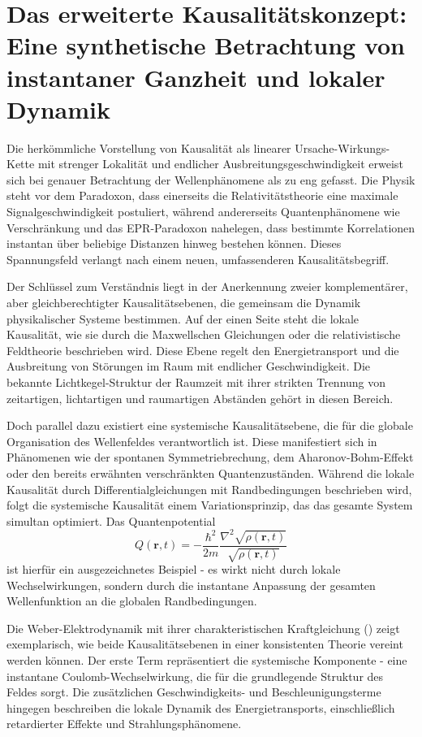 \section{Das erweiterte Kausalitätskonzept: Eine synthetische Betrachtung von instantaner Ganzheit und lokaler Dynamik}
Die herkömmliche Vorstellung von Kausalität als linearer Ursache-Wirkungs-Kette mit strenger Lokalität und endlicher Ausbreitungsgeschwindigkeit erweist sich bei genauer Betrachtung
der Wellenphänomene als zu eng gefasst. Die Physik steht vor dem Paradoxon, dass einerseits die Relativitätstheorie eine maximale Signalgeschwindigkeit postuliert, während andererseits
Quantenphänomene wie Verschränkung und das EPR-Paradoxon nahelegen, dass bestimmte Korrelationen instantan über beliebige Distanzen hinweg bestehen können. Dieses Spannungsfeld verlangt
nach einem neuen, umfassenderen Kausalitätsbegriff.

Der Schlüssel zum Verständnis liegt in der Anerkennung zweier komplementärer, aber gleichberechtigter Kausalitätsebenen, die gemeinsam die Dynamik physikalischer Systeme bestimmen.
Auf der einen Seite steht die lokale Kausalität, wie sie durch die Maxwellschen Gleichungen oder die relativistische Feldtheorie beschrieben wird. Diese Ebene regelt den Energietransport
und die Ausbreitung von Störungen im Raum mit endlicher Geschwindigkeit. Die bekannte Lichtkegel-Struktur der Raumzeit mit ihrer strikten Trennung von zeitartigen, lichtartigen und
raumartigen Abständen gehört in diesen Bereich.

Doch parallel dazu existiert eine systemische Kausalitätsebene, die für die globale Organisation des Wellenfeldes verantwortlich ist. Diese manifestiert sich in Phänomenen wie der
spontanen Symmetriebrechung, dem Aharonov-Bohm-Effekt oder den bereits erwähnten verschränkten Quantenzuständen. Während die lokale Kausalität durch Differentialgleichungen mit
Randbedingungen beschrieben wird, folgt die systemische Kausalität einem Variationsprinzip, das das gesamte System simultan optimiert.
Das Quantenpotential
\begin{equation}
    \label{eq:bohm_potenzial}
    Q(\mathbf{r},t) = -\frac{\hbar^2}{2m} \frac{\nabla^2 \sqrt{\rho(\mathbf{r},t)}}{\sqrt{\rho(\mathbf{r},t)}}
\end{equation}
ist hierfür ein ausgezeichnetes Beispiel - es wirkt nicht durch lokale Wechselwirkungen, sondern durch die instantane Anpassung der gesamten
Wellenfunktion an die globalen Randbedingungen.

Die Weber-Elektrodynamik mit ihrer charakteristischen Kraftgleichung () zeigt exemplarisch, wie beide Kausalitätsebenen in einer konsistenten Theorie vereint werden können.
Der erste Term repräsentiert die systemische Komponente - eine instantane Coulomb-Wechselwirkung, die für die grundlegende Struktur des Feldes sorgt. Die zusätzlichen Geschwindigkeits- und
Beschleunigungsterme hingegen beschreiben die lokale Dynamik des Energietransports, einschließlich retardierter Effekte und Strahlungsphänomene.

